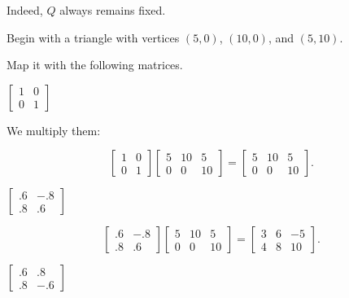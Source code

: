 \documentclass[../gatm_answers.tex]{subfiles}
\begin{document}
Indeed, $Q$ always remains fixed.

\begin{outer_problem}
\item Begin with a triangle with vertices $(5,0)$, $(10,0)$, and $(5,10)$.
\end{outer_problem}


\begin{inner_problem}[start=1]
\item Map it with the following matrices.
\end{inner_problem}

\begin{iinner_problem}[start=1]
\item $\left[\begin{array}{cc}1 & 0 \\ 0 & 1 \end{array}\right]$
\end{iinner_problem}

We multiply them:

$$\begin{bmatrix} 1 & 0 \\ 0 & 1 \end{bmatrix} \begin{bmatrix} 5 & 10 & 5 \\ 0 & 0 & 10 \end{bmatrix} = \begin{bmatrix} 5 & 10 & 5 \\ 0 & 0 & 10 \end{bmatrix}.$$

\begin{iinner_problem}
\item $\left[\begin{array}{cc}.6 & -.8 \\ .8 & .6 \end{array}\right]$
\end{iinner_problem}

$$\begin{bmatrix} .6 & -.8 \\ .8 & .6 \end{bmatrix} \begin{bmatrix} 5 & 10 & 5 \\ 0 & 0 & 10 \end{bmatrix} = \begin{bmatrix} 3 & 6 & -5 \\ 4 & 8 & 10 \end{bmatrix}.$$

\begin{iinner_problem}
\item $\left[\begin{array}{cc}.6 & .8 \\ .8 & -.6 \end{array}\right]$
\end{iinner_problem}
\end{document}

